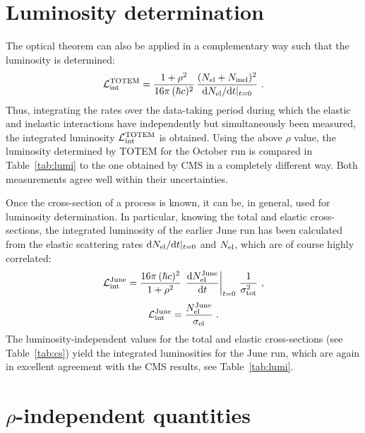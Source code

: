 \documentclass[TOTEM]{cern/cernphprep}
\def\d{{\rm d}}
\begin{document}
\TabCS

\FigSigmas

\section{Luminosity determination}

The optical theorem can also be applied in a complementary way such that the luminosity is determined:
\begin{equation}
\label{eq:lumi oct}
{\cal L_{\rm int}^{\rm TOTEM}} = {1 + \rho^2 \over 16\pi\, (\hbar c)^2}\, { (N_{\rm el} + N_{\rm inel})^2 \over \d N_{\rm el}/\d t|_{t=0} }\ .
\end{equation}
Thus, integrating the rates over the data-taking period during which the elastic \cite{P1} and inelastic \cite{P2} interactions have independently but simultaneously been measured, the integrated luminosity ${\cal L}_{\rm int}^{\rm TOTEM}$ is obtained. Using the above $\rho$ value, the luminosity determined by TOTEM for the October run is compared in Table~\ref{tab:lumi} to the one obtained by CMS in a completely different way. Both measurements agree well within their uncertainties.


Once the cross-section of a process is known, it can be, in general, used for luminosity determination. In particular, knowing the total and elastic cross-sections, the integrated luminosity of the earlier June run \cite{epl96} has been calculated from the elastic scattering rates $\d N_{\rm el}/\d t|_{t=0}$ and $N_{\rm el}$, which are of course highly correlated:
\begin{equation}
\label{eq:lumi jun tot}
{\cal L}_{\rm int}^{\rm June} =  {16\pi\, (\hbar c)^2\over 1 + \rho^2}\, \left. \d N_{\rm el}^{\rm June}\over\d t\right|_{t=0}\, {1\over \sigma_{\rm tot}^2}\ ,
\end{equation}
\begin{equation}
\label{eq:lumi jun el}
{\cal L}_{\rm int}^{\rm June} = {N_{\rm el}^{\rm June}\over \sigma_{\rm el}}\ .
\end{equation}
The luminosity-independent values for the total and elastic cross-sections (see Table~\ref{tab:cs}) yield the integrated luminosities for the June run, which are again in excellent agreement with the CMS results, see Table~\ref{tab:lumi}.

\TabLumi

\section{$\rho$-independent quantities}
\end{document}
